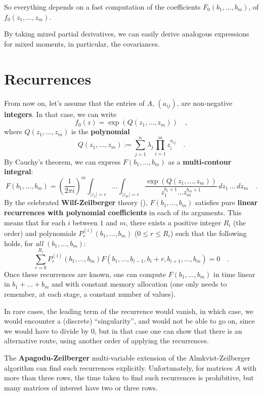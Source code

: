 \documentclass[11pt]{article}
\begin{document}
So everything depends on a fast computation of the 
coefficients $F_0(b_1, \ldots  , b_m)$,  of $f_0(z_1, \ldots  , z_m)$.

By taking mixed partial derivatives, we can easily derive analogous
expressions for mixed moments, in particular, the covariances.

\section{Recurrences}
\label{sec:recurrences}

From now on, let's assume that the entries of $A$, $(a_{ij})$,
are non-negative {\bf integers}. In that case, we can write
\[
f_0(z)=\exp( Q(z_1, \ldots , z_m) ) \quad,
\]
where $Q(z_1, \ldots  , z_m)$ is the {\bf polynomial}
\[
Q(z_1, \ldots , z_m) :=
\sum_{j=1}^{n} \lambda _j \prod_{i=1}^{m} z_i^{a_{ij}} 
\quad .
\]
By Cauchy's theorem, we can express $F(b_1, \ldots , b_m)$ as
a {\bf multi-contour integral}:
\[
F(b_1, \ldots , b_m) =
\left ( \frac{1}{2 \pi i}  \right )^m
\int_{|z_1|=c} \ldots  \int_{|z_m|=c}
\frac {\exp( Q(z_1, \ldots , z_m) )} {z_1^{b_1+1} \ldots  z_m^{b_m+1} }
\, dz_1 \, \ldots  \, dz_m
\quad .
\]
By the celebrated {\bf Wilf-Zeilberger} theory (\cite{WZ}),
$F(b_1, \ldots , b_m)$ satisfies pure {\bf linear recurrences with
polynomial coefficients} in each of its arguments.
This means that for each $i$ between $1$ and $m$, there
exists a positive integer $R_i$ (the order) and polynomials
$P^{(i)}_r(b_1, \ldots , b_m)$ ($0 \leq r \leq R_i$)
such that the following
holds, for \emph{all} $(b_1, \ldots  , b_m)$:
\[
\sum_{r=0}^{R_i} P^{(i)}_r(b_1, \ldots , b_m)
F(b_1, \ldots , b_{i-1}, b_i+r, b_{i+1} , \ldots  , b_m) = 0 \quad .
\]
Once these recurrences are known, one can compute
$F(b_1, \ldots , b_m)$ in 
time linear in $b_1 + \ldots  + b_m$ and 
with constant memory allocation (one only needs to
remember, at each stage, a constant number of values).

In rare cases, the leading term of the recurrence would vanish, in which case,
we would encounter a (discrete) ``singularity'', and would not be able to go
on, since we would have to divide by $0$, but in that case one can show that
there is an alternative route, using another order of applying the
recurrences.

The {\bf Apagodu-Zeilberger}
multi-variable extension\cite{ApZ} of the Almkvist-Zeilberger
algorithm\cite{AlZ} can find such recurrences explicitly. Unfortunately,
for matrices $A$ with more than three rows, the time taken to
find such recurrences is prohibitive, but many matrices of
interest have two or three rows.  
\end{document}
